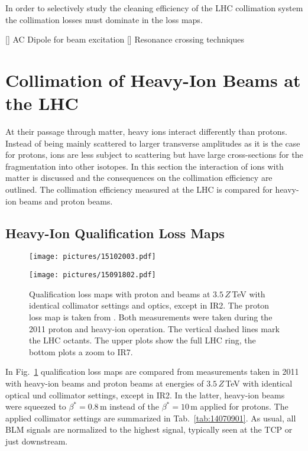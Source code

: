 In order to selectively study the cleaning efficiency of the LHC collimation system the collimation losses must dominate in the loss maps.


[] AC Dipole for beam excitation
[] Resonance crossing techniques



\section{Collimation of Heavy-Ion Beams at the LHC}

At their passage through matter, heavy ions interact differently than protons. Instead of being mainly scattered to larger transverse amplitudes as it is the case for protons, ions are less subject to scattering but have large cross-sections for the fragmentation into other isotopes.  In this section the interaction of ions with matter is discussed and the consequences on the collimation efficiency are outlined. The collimation efficiency measured at the LHC is compared for heavy-ion beams and proton beams.


\subsection{Heavy-Ion Qualification Loss Maps}

\begin{figure}[b]
  \begin{center}
\begin{minipage}[t]{0.49\textwidth}
\texttt{[image: pictures/15102003.pdf]}
\end{minipage}
\begin{minipage}[t]{0.49\textwidth}
\texttt{[image: pictures/15091802.pdf]}
\end{minipage}
\caption{Qualification loss maps with proton and \lead beams at $3.5\,Z\,$TeV with identical collimator settings and optics, except in IR2. The proton loss map is taken from \cite{Bruce2014a}. Both measurements were taken during the 2011 proton and heavy-ion operation. The vertical dashed lines mark the LHC octants. The upper plots show the full LHC ring, the bottom plots a zoom to IR7.}
\label{fig:meas_lm_comparison}
  \end{center}
\end{figure}


In Fig.~\ref{fig:meas_lm_comparison} qualification loss maps are compared from measurements taken in 2011 with heavy-ion beams and proton beams at energies of $3.5\,Z\,$TeV with identical optical und collimator settings, except in IR2. In the latter, heavy-ion beams were squeezed to \mbox{$\beta^*=0.8\,$m} instead of the $\beta^*=10\,$m applied for protons. The applied collimator settings are summarized in Tab.~\ref{tab:14070901}. As usual, all BLM signals are normalized to the highest signal, typically seen at the TCP or just downstream. 

